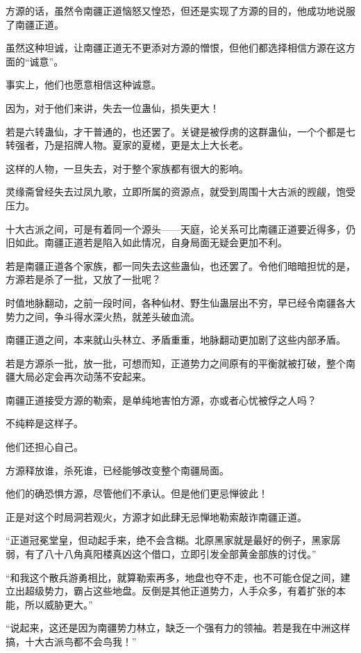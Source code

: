 
\begin{this_body}

方源的话，虽然令南疆正道恼怒又惶恐，但还是实现了方源的目的，他成功地说服了南疆正道。

虽然这种坦诚，让南疆正道无不更添对方源的憎恨，但他们都选择相信方源在这方面的“诚意”。

事实上，他们也愿意相信这种诚意。

因为，对于他们来讲，失去一位蛊仙，损失更大！

若是六转蛊仙，才干普通的，也还罢了。关键是被俘虏的这群蛊仙，一个个都是七转强者，乃是招牌人物。夏家的夏槎，更是太上大长老。

这样的人物，一旦失去，对于整个家族都有很大的影响。

灵缘斋曾经失去过凤九歌，立即所属的资源点，就受到周围十大古派的觊觎，饱受压力。

十大古派之间，可是有着同一个源头——天庭，论关系可比南疆正道要近得多，仍旧如此。南疆正道若是陷入如此情况，自身局面无疑会更加不利。

若是南疆正道各个家族，都一同失去这些蛊仙，也还罢了。令他们暗暗担忧的是，方源若是杀了一批，又放了一批呢？

时值地脉翻动，之前一段时间，各种仙材、野生仙蛊层出不穷，早已经令南疆各大势力之间，争斗得水深火热，就差头破血流。

南疆正道之间，本来就山头林立、矛盾重重，地脉翻动更加剧了这些内部矛盾。

若是方源杀一批，放一批，可想而知，正道势力之间原有的平衡就被打破，整个南疆大局必定会再次动荡不安起来。

南疆正道接受方源的勒索，是单纯地害怕方源，亦或者心忧被俘之人吗？

不纯粹是这样子。

他们还担心自己。

方源释放谁，杀死谁，已经能够改变整个南疆局面。

他们的确恐惧方源，尽管他们不承认。但是他们更忌惮彼此！

正是对这个时局洞若观火，方源才如此肆无忌惮地勒索敲诈南疆正道。

“正道冠冕堂皇，但动起手来，绝不会含糊。北原黑家就是最好的例子，黑家孱弱，有了八十八角真阳楼真凶这个借口，立即引发全部黄金部族的讨伐。”

“和我这个散兵游勇相比，就算勒索再多，地盘也夺不走，也不可能仓促之间，建立出超级势力，霸占这些地盘。反倒是其他正道势力，人手众多，有着扩张的本能，所以威胁更大。”

“说起来，这还是因为南疆势力林立，缺乏一个强有力的领袖。若是我在中洲这样搞，十大古派鸟都不会鸟我！”


\end{this_body}

